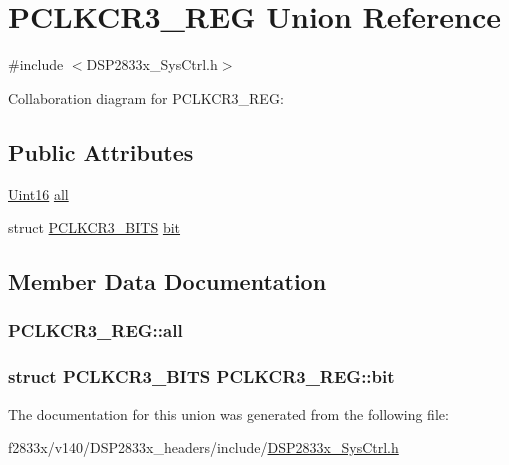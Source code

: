 \hypertarget{union_p_c_l_k_c_r3___r_e_g}{}\section{P\+C\+L\+K\+C\+R3\+\_\+\+R\+E\+G Union Reference}
\label{union_p_c_l_k_c_r3___r_e_g}


{\ttfamily \#include $<$D\+S\+P2833x\+\_\+\+Sys\+Ctrl.\+h$>$}



Collaboration diagram for P\+C\+L\+K\+C\+R3\+\_\+\+R\+E\+G\+:
\subsection*{Public Attributes}
\begin{DoxyCompactItemize}
\item 
\hyperlink{_d_s_p2833x___device_8h_a59a9f6be4562c327cbfb4f7e8e18f08b}{Uint16} \hyperlink{union_p_c_l_k_c_r3___r_e_g_a6d6c88c875ad6245dfa5e791b161201d}{all}
\item 
struct \hyperlink{struct_p_c_l_k_c_r3___b_i_t_s}{P\+C\+L\+K\+C\+R3\+\_\+\+B\+I\+T\+S} \hyperlink{union_p_c_l_k_c_r3___r_e_g_a26c198098151254234fc20cd2bca291b}{bit}
\end{DoxyCompactItemize}


\subsection{Member Data Documentation}
\hypertarget{union_p_c_l_k_c_r3___r_e_g_a6d6c88c875ad6245dfa5e791b161201d}{}
\subsubsection[{all}]{ P\+C\+L\+K\+C\+R3\+\_\+\+R\+E\+G\+::all}\label{union_p_c_l_k_c_r3___r_e_g_a6d6c88c875ad6245dfa5e791b161201d}
\hypertarget{union_p_c_l_k_c_r3___r_e_g_a26c198098151254234fc20cd2bca291b}{}
\subsubsection[{bit}]{\setlength{\rightskip}{0pt plus 5cm}struct {\bf P\+C\+L\+K\+C\+R3\+\_\+\+B\+I\+T\+S} P\+C\+L\+K\+C\+R3\+\_\+\+R\+E\+G\+::bit}\label{union_p_c_l_k_c_r3___r_e_g_a26c198098151254234fc20cd2bca291b}


The documentation for this union was generated from the following file\+:\begin{DoxyCompactItemize}
\item 
f2833x/v140/\+D\+S\+P2833x\+\_\+headers/include/\hyperlink{_d_s_p2833x___sys_ctrl_8h}{D\+S\+P2833x\+\_\+\+Sys\+Ctrl.\+h}\end{DoxyCompactItemize}
